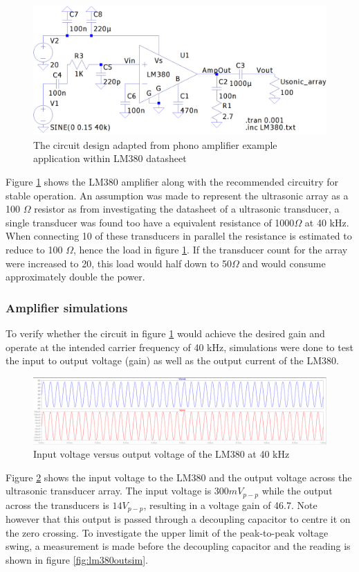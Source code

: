 \begin{figure}[ht!]
    \centering
    \includegraphics[width=\textwidth]{Figures/Design/amplifier/lm380circwhitestable.png}
    \caption{The circuit design adapted from phono amplifier example application within LM380 datasheet}
    \label{fig:lm380circ}
\end{figure}

Figure \ref{fig:lm380circ} shows the LM380 amplifier along with the recommended circuitry for stable operation. An assumption was made to represent the ultrasonic array as a 100 $\Omega$ resistor as from investigating the datasheet of a ultrasonic transducer, a single transducer was found too have a equivalent resistance of 1000$\Omega$ at 40 kHz. When connecting 10 of these transducers in parallel the resistance is estimated to reduce to 100 $\Omega$, hence the load in figure \ref{fig:lm380circ}. If the transducer count for the array were increased to 20, this load would half down to 50$\Omega$ and would consume approximately double the power.

\subsubsection{Amplifier simulations}
To verify whether the circuit in figure \ref{fig:lm380circ} would achieve the desired gain and operate at the intended carrier frequency of 40 kHz, simulations were done to test the input to output voltage (gain) as well as the output current of the LM380.

\begin{figure}[ht!]
    \centering
    \includegraphics[width=\textwidth]{Figures/Design/amplifier/vinvout.png}
    \caption{Input voltage versus output voltage of the LM380 at 40 kHz}
    \label{fig:lm380inoutsim}
\end{figure}
Figure \ref{fig:lm380inoutsim} shows the input voltage to the LM380 and the output voltage across the ultrasonic transducer array. The input voltage is $300mV_{p-p}$ while the output across the transducers is $14V_{p-p}$, resulting in a voltage gain of 46.7. Note however that this output is passed through a decoupling capacitor to centre it on the zero crossing. To investigate the upper limit of the peak-to-peak voltage swing, a measurement is made before the decoupling capacitor and the reading is shown in figure \ref{fig:lm380outsim}.

